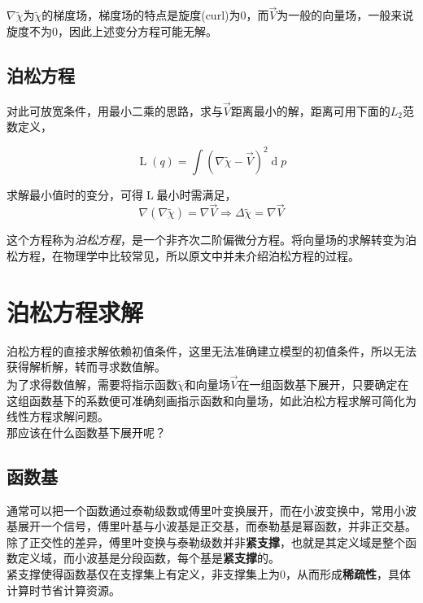 $\nabla \tilde{\chi}$为$\tilde{\chi}$的梯度场，梯度场的特点是旋度(curl)为0，而$\overrightarrow{V}$为一般的向量场，一般来说旋度不为0，因此上述变分方程可能无解。

\subsection*{泊松方程}

对此可放宽条件，用最小二乘的思路，求与$\overrightarrow{V}$距离最小的解，距离可用下面的$L_2$范数定义，

$$
	\mathop{L}(q) = \int \left(\nabla\tilde{\chi} - \overrightarrow{V}\right)^2 \mathop{d}p
$$

求解最小值时的变分，可得$\mathop{L}$最小时需满足，
$$
	\nabla(\nabla \tilde{\chi}) = \nabla\overrightarrow{V} \Rightarrow \Delta \tilde{\chi} = \nabla\overrightarrow{V}
$$

这个方程称为\textit{泊松方程}，是一个非齐次二阶偏微分方程。将向量场的求解转变为泊松方程，在物理学中比较常见，所以原文中并未介绍泊松方程的过程。

\section{泊松方程求解}

	泊松方程的直接求解依赖初值条件，这里无法准确建立模型的初值条件，所以无法获得解析解，转而寻求数值解。\\

	为了求得数值解，需要将指示函数$\tilde{\chi}$和向量场$\overrightarrow{V}$在一组函数基下展开，只要确定在这组函数基下的系数便可准确刻画指示函数和向量场，如此泊松方程求解可简化为线性方程求解问题。\\

	那应该在什么函数基下展开呢？

	\subsection{函数基}
		通常可以把一个函数通过泰勒级数或傅里叶变换展开，而在小波变换中，常用小波基展开一个信号，傅里叶基与小波基是正交基，而泰勒基是幂函数，并非正交基。\\

		除了正交性的差异，傅里叶变换与泰勒级数并非\textbf{紧支撑}，也就是其定义域是整个函数定义域，而小波基是分段函数，每个基是\textbf{紧支撑}的。\\

		紧支撑使得函数基仅在支撑集上有定义，非支撑集上为0，从而形成\textbf{稀疏性}，具体计算时节省计算资源。

